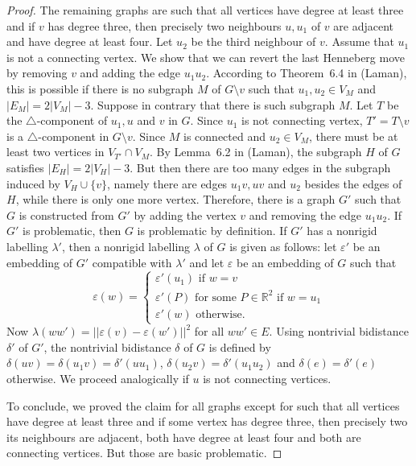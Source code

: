 \documentclass[a4paper, 11pt]{article}
\newcommand{\trcomp}{$\triangle$-component}
\newcommand{\RR}{\mathbb{R}}
\theoremstyle{definition}
\begin{document}
\begin{proof}
The remaining graphs are such that all vertices have degree at least three and if $v$ has degree three, then precisely two neighbours $u,u_1$ of $v$ are adjacent and have degree at least four. Let $u_2$ be the third neighbour of $v$. Assume that $u_1$ is not a connecting vertex. We show that we can revert the last Henneberg move by removing $v$ and adding the edge $u_1u_2$. According to Theorem~6.4 in (Laman), this is possible if there is no subgraph $M$ of $G\setminus v$ such that $u_1,u_2\in V_M$ and $|E_M|=2|V_M|-3$. Suppose in contrary that there is such subgraph $M$. Let $T$ be the \trcomp{} of $u_1, u$ and $v$ in $G$. Since $u_1$ is not connecting vertex, $T'=T\setminus v$ is a \trcomp{} in $G\setminus v$. Since $M$ is connected and $u_2\in V_M$, there must be at least two vertices in $V_{T'}\cap V_M$. By Lemma~6.2 in  (Laman), the subgraph $H$ of $G$ satisfies $|E_H|=2|V_H|-3$. But then there are too many edges in the subgraph induced by $V_H\cup\{v\}$, namely there are edges $u_1v, uv$ and $u_2$ besides the edges of $H$, while there is only one more vertex. Therefore, there is a graph $G'$ such that $G$ is constructed from $G'$ by adding the vertex $v$ and removing the edge $u_1u_2$. If $G'$ is problematic, then $G$ is problematic by definition. If $G'$ has a nonrigid labelling $\lambda'$, then a nonrigid labelling $\lambda$ of $G$ is given as follows: let $\varepsilon'$ be an embedding of $G'$ compatible with $\lambda'$ and let $\varepsilon$ be an embedding of $G$ such that 
$$
\varepsilon(w)=\begin{cases}
\varepsilon'(u_1) \text{ if } w=v\\
\varepsilon'(P) \text{ for some }P\in \RR^2 \text{ if } w=u_1\\
\varepsilon'(w) \text{ otherwise.}
\end{cases}
$$
Now $\lambda(ww')=||\varepsilon(v)-\varepsilon(w')||^2$ for all $ww'\in E$. Using nontrivial bidistance $\delta'$ of $G'$, the nontrivial bidistance $\delta$ of $G$ is defined by $\delta(uv)=\delta(u_1v)=\delta'(uu_1)$, $\delta(u_2v)=\delta'(u_1u_2)$ and $\delta(e)=\delta'(e)$ otherwise. We proceed analogically if $u$ is not connecting vertices.

To conclude, we proved the claim for all graphs except for such that all vertices have degree at least three and if some vertex has degree three, then precisely two its neighbours are adjacent, both have degree at least four and both are connecting vertices. But those are basic problematic.
\end{proof}
\end{document}
